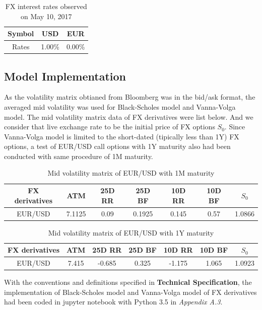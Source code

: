 \begin{table}[htb]
\centering
\caption{{FX interest rates observed on May 10, 2017}}
\begin{tabular}{ccc}
\hline	\hline %
Symbol & USD & EUR   \\ [1ex]%
\hline
Rates & 1.00\% & 0.00\%    \\ [1ex]
\hline
\end{tabular}
\label{table:FX_rates}
\end{table}

\subsection{Model Implementation}
As the volatility matrix obtianed from Bloomberg was in the bid/ask format, the averaged mid volatility was used for Black-Scholes model and Vanna-Volga model. The mid volatility matrix data of FX derivatives were list below. And we consider that live exchange rate to be the initial price of FX options $S_0$.
\newline
\newline
Since Vanna-Volga model is limited to the short-dated (tipically less than 1Y) FX options, a test of EUR/USD call options with 1Y maturity also had been conducted with same procedure of 1M maturity.
\begin{table}[htb]
\centering
\caption{Mid volatility matrix of EUR/USD with 1M maturity}
\begin{tabular}{ccccccc}
\hline \hline
FX derivatives & ATM  & 25D RR  & 25D BF  & 10D RR  & 10D BF & $S_0$\\ [0.5ex]
\hline 
EUR/USD  & 7.1125 &0.09& 0.1925 &0.145 &0.57&1.0866 \\[0.5ex]
\hline
\end{tabular}
\end{table}

\begin{table}[htb]
	\centering
	\caption{Mid volatility matrix of EUR/USD with 1Y maturity}
	\begin{tabular}{ccccccc}
		\hline \hline
		FX derivatives & ATM  & 25D RR  & 25D BF  & 10D RR  & 10D BF & $S_0$\\ [0.5ex]
		\hline 
		EUR/USD  & 7.415&	-0.685&	0.325&	-1.175	&1.065 &1.0923\\[0.5ex]
		\hline
	\end{tabular}
\end{table}

\noindent
With the conventions and definitions specified in \textbf{Technical Specification}, the implementation of Black-Scholes model and Vanna-Volga model of FX derivatives had been coded in jupyter notebook with Python 3.5 in \textit{Appendix A.3}.

